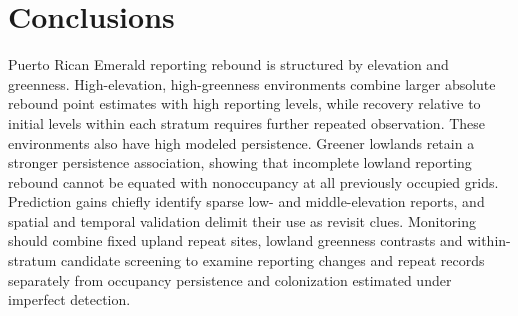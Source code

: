 \section{Conclusions}
Puerto Rican Emerald reporting rebound is structured by elevation and greenness. High-elevation, high-greenness environments combine larger absolute rebound point estimates with high reporting levels, while recovery relative to initial levels within each stratum requires further repeated observation. These environments also have high modeled persistence. Greener lowlands retain a stronger persistence association, showing that incomplete lowland reporting rebound cannot be equated with nonoccupancy at all previously occupied grids. Prediction gains chiefly identify sparse low- and middle-elevation reports, and spatial and temporal validation delimit their use as revisit clues. Monitoring should combine fixed upland repeat sites, lowland greenness contrasts and within-stratum candidate screening to examine reporting changes and repeat records separately from occupancy persistence and colonization estimated under imperfect detection.

\FloatBarrier
